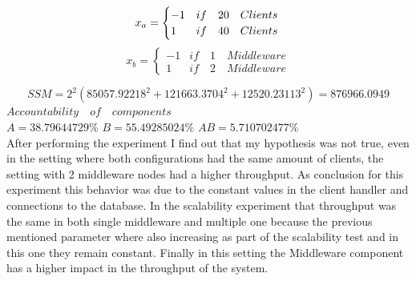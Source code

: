  $$x_{a}=\begin{cases} -1& if\quad 20 \quad Clients  \\1 & if\quad 40 \quad Clients\end{cases}\\
 $$
 $$x_{b}=\begin{cases} -1& if\quad 1 \quad Middleware\\1 & if\quad 2 \quad Middleware\end{cases}$$
 \begin{table}[h]\centering
          \caption{Wieghts on the response variables}
          \label{2kr2}
          
  \end{table}  
  
  $$SSM=2^2(85057.92218^2+121663.3704^2+12520.23113^2)=876966.0949$$
   $Accountability \quad of \quad components$\\
   $A=38.79644729\%$	$B=55.49285024\%$	$AB=5.710702477\%$\\
   
   After performing the experiment I find out that my hypothesis was not true, even in the setting where both configurations had the same amount of clients, the setting with 2 middleware nodes had a higher throughput. As conclusion for this experiment this behavior was due to the constant values in the client handler and connections to the database. In the scalability experiment that throughput was the same in both single middleware and multiple one because the previous mentioned parameter where also increasing as part of the scalability test and in this one they remain constant. Finally in this setting the Middleware component has a higher impact in the throughput of the system.
